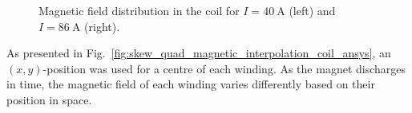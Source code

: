 \begin{figure}[H]
    \centering
    \caption{Magnetic field distribution in the coil for $I=40~\text{A}$ (left) and $I=86~\text{A}$ (right).}
    \label{fig:skew_quad_magnetic_results_coil_ansys}
\end{figure}

As presented in Fig.~\ref{fig:skew_quad_magnetic_interpolation_coil_ansys}, an $(x,y)$-position was used for a centre of each winding. As the magnet discharges in time, the magnetic field of each winding varies differently based on their position in space.

